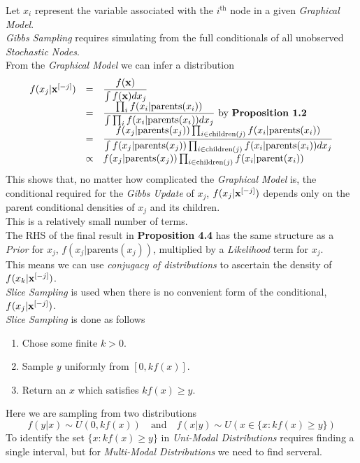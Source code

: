 \documentclass[11pt,a4paper]{article}
\begin{document}
Let $x_i$ represent the variable associated with the $i^\text{th}$ node in a given \textit{Graphical Model}.\\
\textit{Gibbs Sampling} requires simulating from the full conditionals of all unobserved \textit{Stochastic Nodes}.\\
From the \textit{Graphical Model} we can infer a distribution
\[\begin{array}{rcl}
f(x_j|\textbf{x}^{[-j]})&=&\dfrac{f(\textbf{x})}{\int f(\textbf{x})dx_j}\\
&=&\dfrac{\prod_if(x_i|\text{parents}(x_i))}{\int\prod_if(x_i|\text{parents}(x_i))dx_j}\text{ by \textbf{Proposition 1.2}}\\
&=&\dfrac{f(x_j|\text{parents}(x_j))\prod_{i\in\text{children}(j)}f(x_i|\text{parents}(x_i))}{\int f(x_j|\text{parents}(x_j))\prod_{i\in\text{children}(j)}f(x_i|\text{parents}(x_i))dx_j}\\
&\propto&f(x_j|\text{parents}(x_j))\prod_{i\in\text{children}(j)}f(x_i|\text{parent}(x_i))
\end{array}\]
This shows that, no matter how complicated the \textit{Graphical Model} is, the conditional required for the \textit{Gibbs Update} of $x_j$, $f(x_j|\textbf{x}^{[-j]})$ depends only on the parent conditional densities of $x_j$ and its children.\\
This is a relatively small number of terms.\\

The RHS of the final result in \textbf{Proposition 4.4} has the same structure as a \textit{Prior} for $x_j$, $f(x_j|\text{parents}(x_j))$, multiplied by a \textit{Likelihood} term for $x_j$.\\
This means we can use \textit{conjugacy of distributions} to ascertain the density of $f(x_k|\textbf{x}^{[-j]})$.\\

\textit{Slice Sampling} is used when there is no convenient form of the conditional, $f(x_j|\textbf{x}^{[-j]})$.\\
\textit{Slice Sampling} is done as follows
\begin{enumerate}
	\item Chose some finite $k>0$.
	\item Sample $y$ uniformly from $[0,kf(x)]$.
	\item Return an $x$ which satisfies $kf(x)\geq y$.
\end{enumerate}
Here we are sampling from two distributions
$$f(y|x)\sim U(0,kf(x))\quad\text{and}\quad f(x|y)\sim U(x\in\{x:kf(x)\geq y\})$$
To identify the set $\{x:kf(x)\geq y\}$ in \textit{Uni-Modal Distributions} requires finding a single interval, but for \textit{Multi-Modal Distributions} we need to find serveral.
\end{document}
